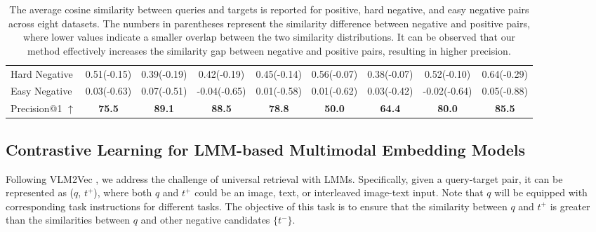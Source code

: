 \documentclass[11pt]{article}
\begin{document}
\begin{table}[]
\begin{tabular}{lcccccccc}
\multicolumn{1}{l|}{Hard Negative}         & 0.51(-0.15) & \multicolumn{1}{c|}{0.39(-0.19)} & 0.42(-0.19)  & \multicolumn{1}{c|}{0.45(-0.14)} & 0.56(-0.07) & \multicolumn{1}{c|}{0.38(-0.07)} & 0.52(-0.10)       & 0.64(-0.29)      \\
\multicolumn{1}{l|}{Easy Negative}         & 0.03(-0.63) & \multicolumn{1}{c|}{0.07(-0.51)} & -0.04(-0.65) & \multicolumn{1}{c|}{0.01(-0.58)} & 0.01(-0.62) & \multicolumn{1}{c|}{0.03(-0.42)} & -0.02(-0.64)      & 0.05(-0.88)      \\
\midrule
\multicolumn{1}{l|}{Precision@1 $\uparrow$}               & \textbf{75.5}       & \multicolumn{1}{c|}{\textbf{89.1}}       & \textbf{88.5}        & \multicolumn{1}{c|}{\textbf{78.8}}       & \textbf{50.0}         & \multicolumn{1}{c|}{\textbf{64.4}}       & \textbf{80.0}               & \textbf{85.5}            \\ 
\bottomrule
\end{tabular}
\caption{The average cosine similarity between queries and targets is reported for positive, hard negative, and easy negative pairs across eight datasets. The numbers in parentheses represent the similarity difference between negative and positive pairs, where lower values indicate a smaller overlap between the two similarity distributions. It can be observed that our method effectively increases the similarity gap between negative and positive pairs, resulting in higher precision.}
\label{tab:preliminary}
\vskip -0.15in
\end{table}

\subsection{Contrastive Learning for LMM-based Multimodal Embedding Models}
\label{sec:contrastive_learning}
Following VLM2Vec \cite{VLM2Vec}, we address the challenge of universal retrieval with LMMs. Specifically, given a query-target pair, it can be represented as ($q$, $t^+$), where both $q$ and $t^+$ could be an image, text, or interleaved image-text input. Note that $q$ will be equipped with corresponding task instructions for different tasks. The objective of this task is to ensure that the similarity between $q$ and $t^+$ is greater than the similarities between $q$ and other negative candidates $\{t^-\}$.
\end{document}

